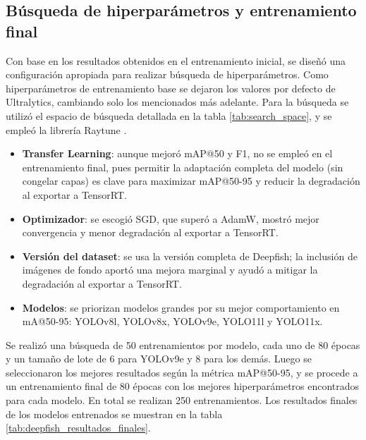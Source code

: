 \subsection{Búsqueda de hiperparámetros y entrenamiento final}
Con base en los resultados obtenidos en el entrenamiento inicial, se diseñó una configuración apropiada para realizar búsqueda de hiperparámetros. Como hiperparámetros de entrenamiento base se dejaron los valores por defecto de Ultralytics, cambiando solo los mencionados más adelante. Para la búsqueda se utilizó el espacio de búsqueda detallada en la tabla \ref{tab:search_space}, y se empleó la librería Raytune \cite{Raytune}.

\begin{itemize}
  \setlength{\itemsep}{0pt}%
  \item \textbf{Transfer Learning}: aunque mejoró mAP@50 y F1, no se empleó en el entrenamiento final, pues permitir la adaptación completa del modelo (sin congelar capas) es clave para maximizar mAP@50-95 y reducir la degradación al exportar a TensorRT.
  \item \textbf{Optimizador}: se escogió SGD, que superó a AdamW, mostró mejor convergencia y menor degradación al exportar a TensorRT.
  \item \textbf{Versión del dataset}: se usa la versión completa de Deepfish; la inclusión de imágenes de fondo aportó una mejora marginal y ayudó a mitigar la degradación al exportar a TensorRT.
  \item \textbf{Modelos}: se priorizan modelos grandes por su mejor comportamiento en mA@50-95: YOLOv8l, YOLOv8x, YOLOv9e, YOLO11l y YOLO11x.
\end{itemize}

Se realizó una búsqueda de 50 entrenamientos por modelo, cada uno de 80 épocas y un tamaño de lote de 6 para YOLOv9e y 8 para los demás. Luego se seleccionaron los mejores resultados según la métrica mAP@50-95, y se procede a un entrenamiento final de 80 épocas con los mejores hiperparámetros encontrados para cada modelo. En total se realizan 250 entrenamientos. Los resultados finales de los modelos entrenados se muestran en la tabla \ref{tab:deepfish_resultados_finales}. 


